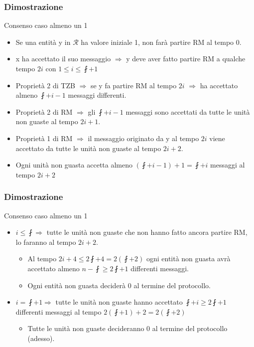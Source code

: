 		
		\begin{frame}
			\frametitle{Dimostrazione}
			\begin{block}{Consenso caso almeno un 1}
				\begin{itemize}
					\item Se una entità y in $\mathcal{R}$ ha valore iniziale 1, non farà partire RM al tempo 0.
					\item x ha accettato il suo messaggio $\Rightarrow$ y deve aver fatto partire RM a qualche tempo $2i$ con $1 \leq i \leq \fint + 1$
					\item Proprietà 2 di TZB $\Rightarrow$ se y fa partire RM al tempo $2i$ $\Rightarrow$ ha accettato almeno $\fint + i - 1$ messaggi differenti.
					\item Proprietà 2 di RM $\Rightarrow$ gli $\fint + i - 1$ messaggi sono accettati da tutte le unità non guaste al tempo $2i + 1$.
					\item Proprietà 1 di RM $\Rightarrow$ il messaggio originato da y al tempo $2i$ viene accettato da tutte le unità non guaste al tempo $2i+2$.
					\item Ogni unità non guasta accetta almeno $(\fint + i - 1) + 1 = \fint + i$ messaggi al tempo $2i + 2$
				\end{itemize}			
			\end{block}
		\end{frame}
	
		\begin{frame}
			\frametitle{Dimostrazione}
			\begin{block}{Consenso caso almeno un 1}
				\begin{itemize}
					\item $i \leq \fint \Rightarrow$ tutte le unità non guaste che non hanno fatto ancora partire RM, lo faranno al tempo $2i + 2$.  
					\begin{itemize}
						\item Al tempo $2i + 4 \leq 2 \fint + 4 = 2(\fint + 2)$ ogni entità non guasta avrà accettato almeno $n - \fint \geq 2 \fint + 1$ differenti messaggi.
						\item Ogni entità non guasta deciderà 0 al termine del protocollo. 
					\end{itemize}
					\item $i = \fint + 1 \Rightarrow$ tutte le unità non guaste hanno accettato $\fint + i \geq 2\fint + 1$ differenti messaggi al tempo $2(\fint + 1) + 2 = 2(\fint + 2)$  
					\begin{itemize}
						\item Tutte le unità non guaste decideranno 0 al termine del protocollo (adesso).
					\end{itemize}								
				\end{itemize}			
			\end{block}
		\end{frame}
	
